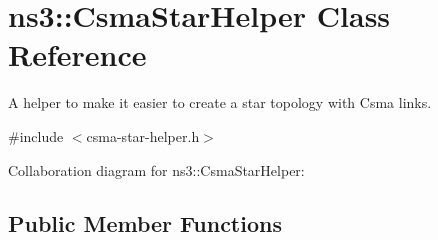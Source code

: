 \hypertarget{classns3_1_1CsmaStarHelper}{}\section{ns3\+:\+:Csma\+Star\+Helper Class Reference}
\label{classns3_1_1CsmaStarHelper}


A helper to make it easier to create a star topology with Csma links.  




{\ttfamily \#include $<$csma-\/star-\/helper.\+h$>$}



Collaboration diagram for ns3\+:\+:Csma\+Star\+Helper\+:
\subsection*{Public Member Functions}
